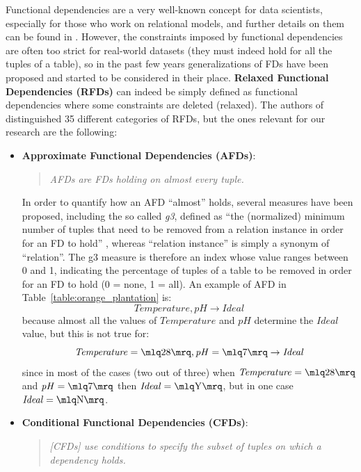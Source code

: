 Functional dependencies are a very well-known concept for data scientists, especially for those who work on relational models, and further details on them can be found in \cite{abiteboul1995foundations}.
However, the constraints imposed by functional dependencies are often too strict for real-world datasets (they must indeed hold for all the tuples of a table), so in the past few years generalizations of FDs have been proposed and started to be considered in their place. \textbf{Relaxed Functional Dependencies (RFDs)} can indeed be simply defined as functional dependencies where some constraints are deleted (relaxed). The authors of \cite{caruccio2015relaxed} distinguished 35 different categories of RFDs, but the ones relevant for our research are the following:
\begin{itemize}
\item \textbf{Approximate Functional Dependencies (AFDs)}:
\begin{quote}\emph{AFDs are FDs holding on almost every tuple.} \cite[p.~151]{caruccio2015relaxed}\end{quote}
In order to quantify how an AFD ``almost'' holds, several measures have been proposed, including the so called \textit{g3}, defined as ``the (normalized) minimum number of tuples that need to be removed from a relation instance in order for an FD to hold'' \cite[p.~151]{caruccio2015relaxed}, whereas ``relation instance'' is simply a synonym of ``relation''. The g3 measure is therefore an index whose value ranges between 0 and 1, indicating the percentage of tuples of a table to be removed in order for an FD to hold (0 = none, 1 = all). An example of AFD in Table~\ref{table:orange_plantation} is: \[\mathit{Temperature}, \mathit{pH} \rightarrow \mathit{Ideal}\] because almost all the values of \(\mathit{Temperature}\) and \(\mathit{pH}\) determine the \(\mathit{Ideal}\) value, but this is not true for: \[\mathit{Temperature} = \mlq 28 \mrq, \mathit{pH} = \mlq 7 \mrq \rightarrow \mathit{Ideal}\] since in most of the cases (two out of three) when \(\mathit{Temperature} = \mlq 28 \mrq\) and \(\mathit{pH} = \mlq 7 \mrq\) then \(\mathit{Ideal} = \mlq \mathrm{Y} \mrq\), but in one case \(\mathit{Ideal} = \mlq \mathrm{N} \mrq\).
\item \textbf{Conditional Functional Dependencies (CFDs)}:
\begin{quote}\emph{\emph{[CFDs]} use conditions to specify the subset of tuples on which a dependency holds.} \cite[p.~152]{caruccio2015relaxed}\end{quote}

\end{itemize}

